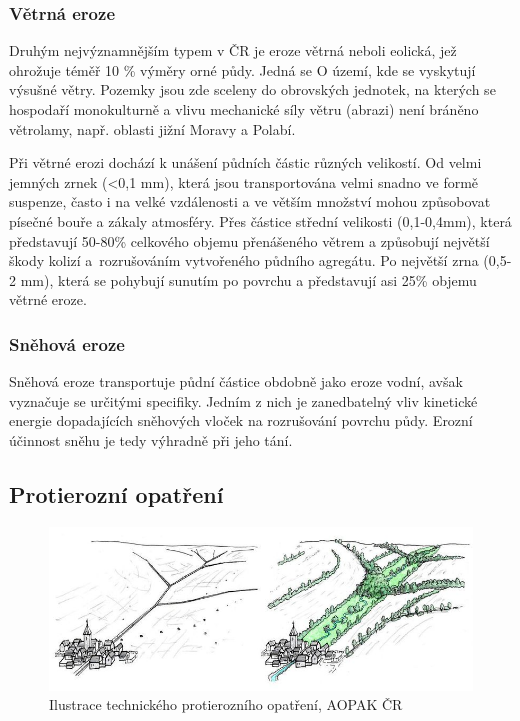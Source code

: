 \subsubsection{Větrná eroze}
Druhým nejvýznamnějším typem v ČR je eroze větrná neboli eolická, jež
ohrožuje téměř 10 \% výměry orné půdy. Jedná se O území, kde se
vyskytují výsušné větry. Pozemky jsou zde sceleny do obrovských
jednotek, na kterých se hospodaří monokulturně a vlivu mechanické síly
větru (abrazi) není bráněno větrolamy, např. oblasti jižní Moravy a
Polabí.

Při větrné erozi dochází k unášení půdních částic různých velikostí.
Od velmi jemných zrnek (<0,1 mm), která jsou transportována velmi
snadno ve formě suspenze, často i na velké vzdálenosti a ve větším
množství mohou způsobovat písečné bouře a zákaly atmosféry. Přes
částice střední velikosti (0,1-0,4mm), která představují 50-80\%
celkového objemu přenášeného větrem a způsobují největší škody kolizí
a~rozrušováním vytvořeného půdního agregátu. Po největší zrna (0,5-2
mm), která se pohybují sunutím po povrchu a představují asi 25\%
objemu větrné eroze.\cite{Holy1994}

\subsubsection{Sněhová eroze}
Sněhová eroze transportuje půdní částice obdobně jako eroze vodní,
avšak vyznačuje se určitými specifiky. Jedním z nich je zanedbatelný
vliv kinetické energie dopadajících sněhových vloček na rozrušování
povrchu půdy. Erozní účinnost sněhu je tedy výhradně při jeho
tání.\cite{Holy1994}

\subsection{Protierozní opatření}
\begin{figure}[H]
    \centering
    \includegraphics[scale=0.5]{./pictures/protierozni_opatreni.jpg}
      \caption[Ilustrace technického protierozního opatření]{Ilustrace
        technického protierozního opatření, AOPAK ČR\cite{AOPAK} }
      \label{fig:r_faktor_graph}
\end{figure}


